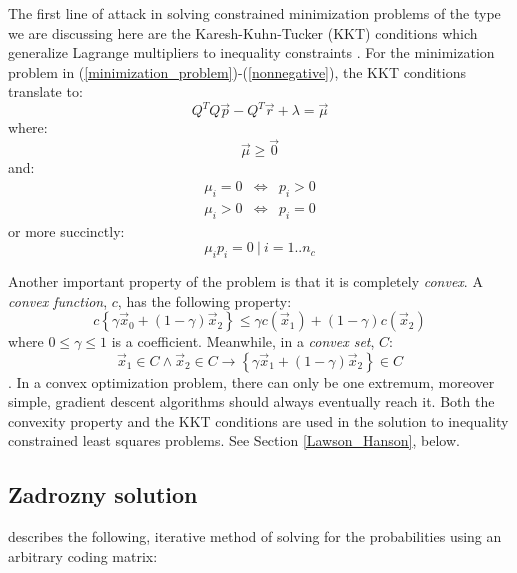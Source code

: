 \documentclass{article}
\newenvironment{eqnnon}{\begin{equation*}}{\end{equation*}}
\newenvironment{eqnarraynon}{\begin{eqnarray*}}{\end{eqnarray*}}
\begin{document}
The first line of attack in solving constrained minimization problems of the
type we are discussing here are the Karesh-Kuhn-Tucker (KKT) conditions
which generalize Lagrange multipliers to inequality constraints
\citep{Lawson_Hanson1995,Boyd_Vandenberghe2004}.
For the minimization problem in (\ref{minimization_problem})-(\ref{nonnegative}), the KKT conditions translate to:
\begin{eqnnon}
	Q^T Q \vec p - Q^T \vec r + \lambda = \vec \mu
\end{eqnnon}
where:
\begin{eqnnon}
	\vec \mu \ge \vec 0
\end{eqnnon}
and:
\begin{eqnarraynon}
	\mu_i = 0 & \iff & p_i > 0 \\
	\mu_i > 0 & \iff & p_i = 0
\end{eqnarraynon}
or more succinctly:
\begin{eqnnon}
	\mu_i p_i = 0 ~ | ~ i = 1..n_c
\end{eqnnon}

Another important property of the problem is that it is completely {\it convex}.
A {\it convex function}, $c$, has the following property:
\begin{eqnnon}
	c \left \lbrace \gamma \vec x_0 + (1 - \gamma) \vec x_2 \right \rbrace
	\le \gamma c(\vec x_1) + (1 - \gamma) c(\vec x_2)
\end{eqnnon}
where $0 \le \gamma \le 1$ is a  coefficient.
Meanwhile, in a {\it convex set}, $C$:
\begin{eqnnon}
	\vec x_1 \in C \land \vec x_2 \in C \rightarrow 
\left \lbrace \gamma \vec x_1 + (1 - \gamma) \vec x_2 \right \rbrace \in C
\end{eqnnon}
\citep{Boyd_Vandenberghe2004}.
In a convex optimization problem, there can only be one extremum, moreover
simple, gradient descent algorithms should always eventually reach it.
Both the convexity property and the KKT conditions are used in the 
\citet{Lawson_Hanson1995} solution to inequality constrained least
squares problems.
See Section \ref{Lawson_Hanson}, below.



\subsection{Zadrozny solution}

\citet{Zadrozny2001} describes the following, iterative method of solving
for the probabilities using an arbitrary coding matrix:
\end{document}
